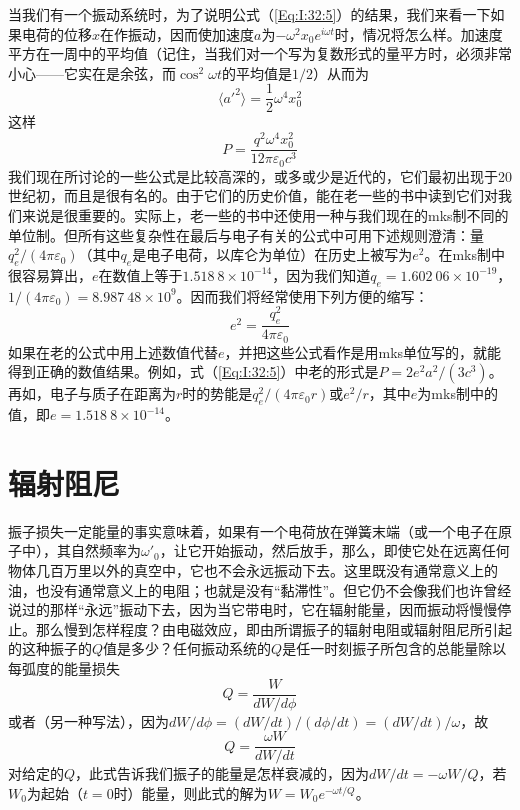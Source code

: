 当我们有一个振动系统时，为了说明公式（\ref{Eq:I:32:5}）的结果，我们来看一下如果电荷的位移$x$在作振动，因而使加速度$a$为$-\omega^2x_0e^{i\omega t}$时，情况将怎么样。加速度平方在一周中的平均值（记住，当我们对一个写为复数形式的量平方时，必须非常小心——它实在是余弦，而$\cos^2\omega t$的平均值是$1/2$）从而为
\begin{equation*}
    \langle a'^2 \rangle = \frac{1}{2}\omega^4x_0^2
\end{equation*}
这样
\begin{equation}
    \label{Eq:I:32:6}
    P = \frac{q^2\omega^4x_0^2}{12\pi\varepsilon_0c^3}
\end{equation}
我们现在所讨论的一些公式是比较高深的，或多或少是近代的，它们最初出现于20世纪初，而且是很有名的。由于它们的历史价值，能在老一些的书中读到它们对我们来说是很重要的。实际上，老一些的书中还使用一种与我们现在的mks制不同的单位制。但所有这些复杂性在最后与电子有关的公式中可用下述规则澄清：量$q_e^2/(4\pi\varepsilon_0)$（其中$q_e$是电子电荷，以库仑为单位）在历史上被写为$e^2$。在mks制中很容易算出，$e$在数值上等于$1.518~8\times 10^{-14}$，因为我们知道$q_e=1.602~06\times 10^{-19}$，$1/(4\pi\varepsilon_0)=8.987~48\times 10^9$。因而我们将经常使用下列方便的缩写：
\begin{equation}
    \label{Eq:I:32:7}
    e^2=\frac{q_e^2}{4\pi\varepsilon_0}
\end{equation}
如果在老的公式中用上述数值代替$e$，并把这些公式看作是用mks单位写的，就能得到正确的数值结果。例如，式（\ref{Eq:I:32:5}）中老的形式是$P=2e^2a^2/(3c^3)$。再如，电子与质子在距离为$r$时的势能是$q_e^2/(4\pi\varepsilon_0r)$或$e^2/r$，其中$e$为mks制中的值，即$e=1.518~8\times 10^{-14}$。

\section{辐射阻尼}

振子损失一定能量的事实意味着，如果有一个电荷放在弹簧末端（或一个电子在原子中），其自然频率为$\omega'_0$，让它开始振动，然后放手，那么，即使它处在远离任何物体几百万里以外的真空中，它也不会永远振动下去。这里既没有通常意义上的油，也没有通常意义上的电阻；也就是没有“黏滞性”。但它仍不会像我们也许曾经说过的那样“永远”振动下去，因为当它带电时，它在辐射能量，因而振动将慢慢停止。那么慢到怎样程度？由电磁效应，即由所谓振子的辐射电阻或辐射阻尼所引起的这种振子的$Q$值是多少？任何振动系统的$Q$是任一时刻振子所包含的总能量除以每弧度的能量损失
\begin{equation*}
    Q=\frac{W}{dW/d\phi}
\end{equation*}
或者（另一种写法），因为$dW/d\phi = (dW/dt)/(d\phi/dt) = (dW/dt)/\omega$，故
\begin{equation}
    \label{Eq:I:32:8}
    Q=\frac{\omega W}{dW / dt}
\end{equation}
对给定的$Q$，此式告诉我们振子的能量是怎样衰减的，因为$dW/dt=-\omega W/Q$，若$W_0$为起始（$t=0$时）能量，则此式的解为$W=W_0e^{-\omega t/Q}$。

